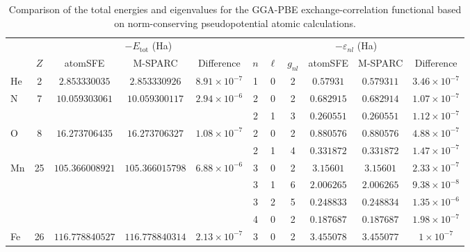 \begin{table}[!htbp]
    \centering
    \footnotesize
    \setlength{\tabcolsep}{3pt}
    \renewcommand{\arraystretch}{0.9}
    \caption{Comparison of the total energies and eigenvalues for the GGA-PBE exchange-correlation functional based on norm-conserving pseudopotential atomic calculations.}
    \label{tab:pseudo-gga-pbe-eigs}
    \begin{tabular}{@{}l c ccc ccc ccc@{}}
        \toprule
        & & \multicolumn{3}{c}{$-E_{\mathrm{tot}}$ (Ha)} & \multicolumn{6}{c}{$-\varepsilon_{nl}$ (Ha)} \\
        \cmidrule(lr){3-5} \cmidrule(lr){6-11}
         & $Z$ & atomSFE & M-SPARC & Difference & $n$ & $\ell$ & $g_{nl}$ & atomSFE & M-SPARC & Difference \\
        \midrule
        \multirow[t]{1}{*}{He} & \multirow[t]{1}{*}{2} & \multirow[t]{1}{*}{$2.853330035$} & \multirow[t]{1}{*}{$2.853330926$} & \multirow[t]{1}{*}{$8.91 \times 10^{-7}$} & 1 & 0 & 2 & $0.57931$ & $0.579311$ & $3.46 \times 10^{-7}$ \\
        \multirow[t]{2}{*}{N} & \multirow[t]{2}{*}{7} & \multirow[t]{2}{*}{$10.059303061$} & \multirow[t]{2}{*}{$10.059300117$} & \multirow[t]{2}{*}{$2.94 \times 10^{-6}$} & 2 & 0 & 2 & $0.682915$ & $0.682914$ & $1.07 \times 10^{-7}$ \\
         &  &  &  &  & 2 & 1 & 3 & $0.260551$ & $0.260551$ & $1.12 \times 10^{-7}$ \\
        \multirow[t]{2}{*}{O} & \multirow[t]{2}{*}{8} & \multirow[t]{2}{*}{$16.273706435$} & \multirow[t]{2}{*}{$16.273706327$} & \multirow[t]{2}{*}{$1.08 \times 10^{-7}$} & 2 & 0 & 2 & $0.880576$ & $0.880576$ & $4.88 \times 10^{-7}$ \\
         &  &  &  &  & 2 & 1 & 4 & $0.331872$ & $0.331872$ & $1.47 \times 10^{-7}$ \\
        \multirow[t]{4}{*}{Mn} & \multirow[t]{4}{*}{25} & \multirow[t]{4}{*}{$105.366008921$} & \multirow[t]{4}{*}{$105.366015798$} & \multirow[t]{4}{*}{$6.88 \times 10^{-6}$} & 3 & 0 & 2 & $3.15601$ & $3.15601$ & $2.33 \times 10^{-7}$ \\
         &  &  &  &  & 3 & 1 & 6 & $2.006265$ & $2.006265$ & $9.38 \times 10^{-8}$ \\
         &  &  &  &  & 3 & 2 & 5 & $0.248833$ & $0.248834$ & $1.35 \times 10^{-6}$ \\
         &  &  &  &  & 4 & 0 & 2 & $0.187687$ & $0.187687$ & $1.98 \times 10^{-7}$ \\
        \multirow[t]{4}{*}{Fe} & \multirow[t]{4}{*}{26} & \multirow[t]{4}{*}{$116.778840527$} & \multirow[t]{4}{*}{$116.778840314$} & \multirow[t]{4}{*}{$2.13 \times 10^{-7}$} & 3 & 0 & 2 & $3.455078$ & $3.455077$ & $1 \times 10^{-7}$ \\

\end{tabular}
\end{table}
